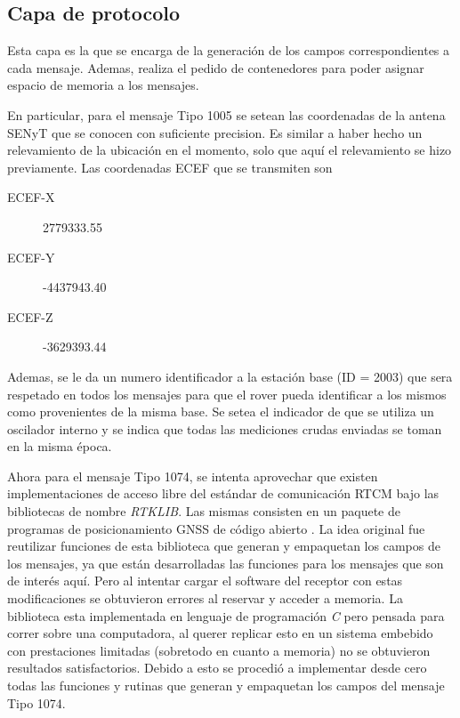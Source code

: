 \documentclass[a4paper,12pt,oneside,onecolumn,final,openright]{book}%
\begin{document}
	
\subsection{Capa de protocolo}
		
	Esta capa es la que se encarga de la generación de los campos correspondientes a cada mensaje. Ademas, realiza el pedido de contenedores para poder asignar espacio de memoria a los mensajes. 
	
	 En particular, para el mensaje Tipo 1005 se setean las coordenadas de la antena SENyT que se conocen con suficiente precision. Es similar a haber hecho un relevamiento de la ubicación en el momento, solo que aquí el relevamiento se hizo previamente. Las coordenadas ECEF que se transmiten son
\begin{description}
	\item[ECEF-X] 2779333.55
	\item[ECEF-Y] -4437943.40
	\item[ECEF-Z] -3629393.44
\end{description}

	Ademas, se le da un numero identificador a la estación base (ID = 2003) que sera respetado en todos los mensajes para que el rover pueda identificar a los mismos como provenientes de la misma base. Se setea el indicador de que se utiliza un oscilador interno y se indica que todas las mediciones crudas enviadas se toman en la misma época.
	
	Ahora para el mensaje Tipo 1074, se intenta aprovechar que existen implementaciones de acceso libre del estándar de comunicación RTCM bajo las bibliotecas de nombre \textit{RTKLIB}. Las mismas consisten en un paquete de programas de posicionamiento GNSS de código abierto \cite{rtklib}. La idea original fue reutilizar funciones de esta biblioteca que generan y empaquetan los campos de los mensajes, ya que están desarrolladas las funciones para los mensajes que son de interés aquí. Pero al intentar cargar el software del receptor con estas modificaciones se obtuvieron errores al reservar y acceder a memoria. La biblioteca esta implementada en lenguaje de programación \textit{C} pero pensada para correr sobre una computadora, al querer replicar esto en un sistema embebido con prestaciones limitadas (sobretodo en cuanto a memoria) no se obtuvieron resultados satisfactorios. Debido a esto se procedió a implementar desde cero todas las funciones y rutinas que generan y empaquetan los campos del mensaje Tipo 1074.
	
\end{document}
